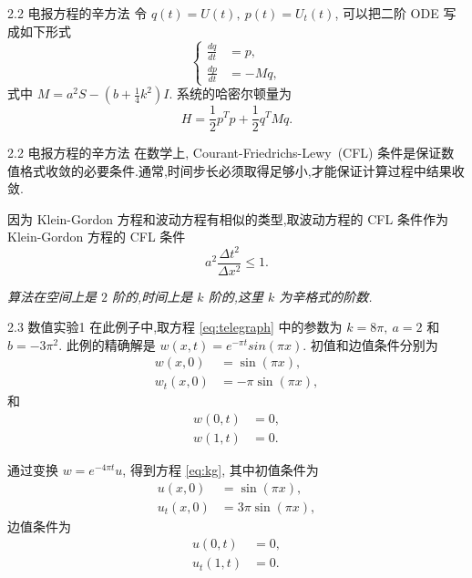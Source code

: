 \documentclass{beamer}
\begin{document}
\begin{frame}{2.2 电报方程的辛方法}
令 $q(t)=U(t),~ p(t)=U_t(t)$, 可以把二阶 ODE 写成如下形式
\begin{equation}\label{eq:ode}
\left\lbrace
\begin{aligned}
\frac{dq}{dt}&=p,\\
\frac{dp}{dt}&=-Mq,
\end{aligned}
\right.
\end{equation}
式中 $M=a^2 S-(b+\frac{1}{4}k^2)I.$
系统的哈密尔顿量为
\begin{equation*}
H=\frac{1}{2}p^Tp+\frac{1}{2}q^TMq.
\end{equation*}
\end{frame}

\begin{frame}{2.2 电报方程的辛方法}
\qquad 在数学上, Courant-Friedrichs-Lewy~(CFL) 条件是保证数值格式收敛的必要条件.通常,时间步长必须取得足够小,才能保证计算过程中结果收敛.

\qquad 因为 Klein-Gordon 方程和波动方程有相似的类型,取波动方程的 CFL 条件作为 Klein-Gordon 方程的 CFL 条件
\begin{equation*}
a^2\frac{\Delta t^2}{\Delta x^2}\le 1.
\end{equation*}

\begin{theorem}[算法的阶]\label{thm:tele}
\emph{算法在空间上是 $2$ 阶的,时间上是 $k$ 阶的,这里 $k$ 为辛格式的阶数.}
\end{theorem}
\end{frame}

\begin{frame}{2.3 数值实验1}
在此例子中,取方程 \eqref{eq:telegraph} 中的参数为 $k = 8\pi,~a = 2$ 和 $b
= -3\pi^2$. 此例的精确解是 $w(x,t) = e^{-\pi t}sin(\pi x)$. 初值和边值条件分别为
\begin{equation*}
\begin{aligned}
w(x,0)&=\sin(\pi x),\\
w_t(x,0)&=-\pi \sin(\pi x),
\end{aligned}
\end{equation*}
和
\begin{equation*}
\begin{aligned}
w(0,t)&=0,\\
w(1,t)&=0.
\end{aligned}
\end{equation*}

通过变换 $w = e^{-4\pi t}u$, 得到方程 \eqref{eq:kg}, 其中初值条件为
\begin{equation*}
\begin{aligned}
u(x,0)&=\sin(\pi x),\\
u_t(x,0)&=3\pi \sin(\pi x),
\end{aligned}
\end{equation*}
边值条件为
\begin{equation*}
\begin{aligned}
u(0,t)&=0,\\
u_t(1,t)&=0.
\end{aligned}
\end{equation*}
\end{frame}
\end{document}
